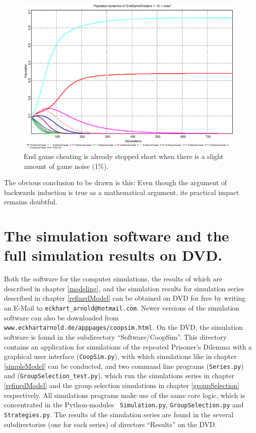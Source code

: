 \begin{figure}
\begin{center}
  \includegraphics[width=20cm]{images/EndGameCheaters_1-10_gamenoise.eps}
\caption{\label{EndGameCheaters2} End game cheating is already stopped short
  when there is a slight amount of game noise (1\%).}
\end{center}
\end{figure}

The obvious conclusion to be drawn is this: Even though the argument of
backwards induction is true as a mathematical argument, its practical impact
remains doubtful.

\newpage
\section{The simulation software and the full simulation results on DVD.}
\label{theSoftware}
Both the software for the computer simulations, the results of which are
described in chapter \ref{modeling}, and the simulation results for simulation
series described in chapter \ref{refinedModel} can be obtained on DVD for free
by writing an E-Mail to {\tt eckhart\_arnold@hotmail.com}. Newer versions of the
simulation software can also be downloaded from {\tt www.eckhartarnold.de/apppages/coopsim.html}.
On the DVD, the simulation software is found in the subdirectory
``Software/CoopSim''. This directory contains an application for simulations of
the repeated Prisoner's Dilemma with a graphical user interface
({\tt CoopSim.py}), with which simulations like in chapter \ref{simpleModel} can
 be conducted, and two command line programs ({\tt Series.py}) and
({\tt GroupSelection\_test.py}), which run the simulations series in chapter
\ref{refinedModel} and the group selection simulations in chapter
\ref{groupSelection} respectively. All simulations programs make use of the
same core logic, which is concentrated in the Python-modules {\tt
Simulation.py}, {\tt GroupSelection.py} and {\tt Strategies.py}. The results of
the simulation series are found in the several subdirectories (one for each
series) of directors ``Results'' on the DVD.

